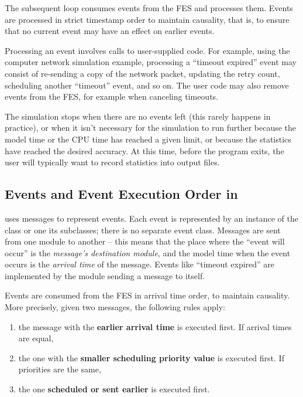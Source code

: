 The subsequent loop consumes events from the FES and processes
them. Events are processed in strict timestamp order
to maintain causality, that is, to ensure that no current event may have
an effect on earlier events.

Processing an event involves calls to user-supplied code. For example,
using the computer network simulation example, processing a ``timeout
expired'' event may consist of re-sending a copy of the network
packet, updating the retry count, scheduling another ``timeout''
event, and so on. The user code may also remove events from the FES,
for example when canceling timeouts.

The simulation stops when there are no events left (this rarely happens
in practice), or when it isn't necessary for the simulation
to run further because the model time or the CPU time has reached
a given limit, or because the statistics have reached the desired
accuracy. At this time, before the program exits, the user
will typically want to record statistics into output files.


\subsection{Events and Event Execution Order in {\opp}}
\label{sec:simple-modules:events-in-opp}

{\opp} uses messages to represent
events. Each event is represented by an instance of the
 class or one its subclasses; there is no separate
event class. Messages are sent from one module to another -- this
means that the place where the ``event will occur'' is the
\textit{message's destination module}, and the model time when the
event occurs is the \textit{arrival time} of the
message. Events like ``timeout expired'' are implemented by the
module sending a message to itself.

Events are consumed from the FES in arrival time order, to
maintain causality. More precisely, given two messages, the following
rules apply:
\begin{enumerate}
\item{the message with the \textbf{earlier arrival time} is executed
    first.  If arrival times are equal,}
\item{the one with the \textbf{smaller scheduling priority value} is
    executed first. If priorities are the same,}
\item{the one \textbf{scheduled or sent earlier} is executed first.}
\end{enumerate}

